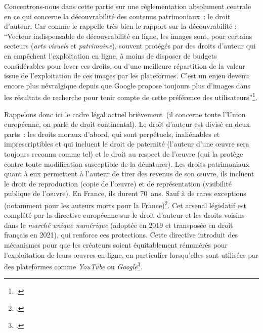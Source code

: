 Concentrons-nous dans cette partie sur une règlementation absolument centrale en ce qui concerne la découvrabilité des contenus patrimoniaux : le droit d’auteur. Car comme le rappelle très bien le rapport sur la découvrabilité : \enquote{Vecteur indispensable de découvrabilité en ligne, les images sont, pour certains secteurs (\textit{arts visuels} et \textit{patrimoine}), souvent protégés par des droits d’auteur qui en empêchent l’exploitation en ligne, à moins de disposer de budgets considérables pour lever ces droits, ou d’une meilleure répartition de la valeur issue de l’exploitation de ces images par les plateformes. C’est un enjeu devenu encore plus névralgique depuis que Google propose toujours plus d’images dans les résultats de recherche pour tenir compte de cette préférence des utilisateurs}\footcite[p. 32]{ministeresdelaculturefranceetquebec2020}.

Rappelons donc ici le cadre légal actuel brièvement (il concerne toute l’Union européenne, on parle de droit continental). Le droit d’auteur est divisé en deux parts : les droits moraux d’abord, qui sont perpétuels, inaliénables et imprescriptibles et qui incluent le droit de paternité (l’auteur d’une œuvre sera toujours reconnu comme tel) et le droit au respect de l’œuvre (qui la protège contre toute modification susceptible de la dénaturer). Les droits patrimoniaux quant à eux permettent à l’auteur de tirer des revenus de son œuvre, ils incluent le droit de reproduction (copie de l’œuvre) et de représentation (visibilité publique de l’œuvre). En France, ils durent 70 ans. Sauf à de rares exceptions (notamment pour les auteurs morts pour la France)\footcite{zotero-323}. Cet arsenal législatif est complété par la directive européenne sur le droit d’auteur et les droits voisins dans le \textit{marché unique numérique} (adoptée en 2019 et transposée en droit français en 2021), qui renforce ces protections. Cette directive introduit des mécanismes pour que les créateurs soient équitablement rémunérés pour l’exploitation de leurs œuvres en ligne, en particulier lorsqu’elles sont utilisées par des plateformes comme \textit{YouTube} ou \textit{Google}\footcite{noauthor_directive_2019}. 

